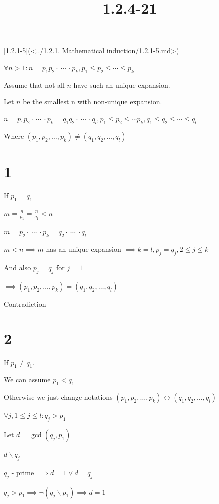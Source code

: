 \documentclass{article}
\title{1.2.4-21}
\begin{document}
\maketitle

[1.2.1-5](<../1.2.1. Mathematical induction/1.2.1-5.md>)

\( \forall n > 1: n = p_1p_2 \cdot\ \cdots\ \cdot p_k, p_1 \leq p_2 \leq \cdots \leq p_k \)

Assume that not all \( n \) have such an unique expansion.

Let \( n \) be the smallest n with non-unique expansion.

\( n = p_1p_2 \cdot\ \cdots\ \cdot p_k = q_1q_2 \cdot\ \cdots\ \cdot q_l, p_1 \leq p_2 \leq \cdots p_k, q_1 \leq q_2 \leq \cdots \leq q_l \)

Where \( (p_1,p_2,\ldots,p_k) \neq (q_1,q_2,\ldots,q_l) \)

\section*{1}

If \( p_1 = q_1 \)

\( m = \frac{n}{p_1} = \frac{n}{q_1} < n \)

\( m = p_2 \cdot\ \cdots\ \cdot p_k = q_2 \cdot\ \cdots\ \cdot q_l \)

\( m < n \implies m \) has an unique expansion \( \implies k = l, p_j = q_j, 2 \leq j \leq k \)

And also \( p_j = q_j \) for \( j = 1 \)

\( \implies (p_1,p_2,\ldots,p_k) = (q_1,q_2,\ldots,q_l) \)

Contradiction

\section*{2}

If \( p_1 \neq q_1 \).

We can assume \( p_1 < q_1 \)

Otherwise we just change notations \( (p_1, p_2, \ldots, p_k) \leftrightarrow (q_1, q_2, \ldots, q_l) \)

\( \forall j, 1 \leq j \leq l: q_j > p_1 \)

Let \( d = \gcd(q_j, p_1) \)

\( d \backslash  q_j \)

\( q_j \) - prime \( \implies d = 1 \lor d = q_j \)

\( q_j > p_1 \implies \lnot(q_j \backslash p_1) \implies d = 1 \)
\end{document}
